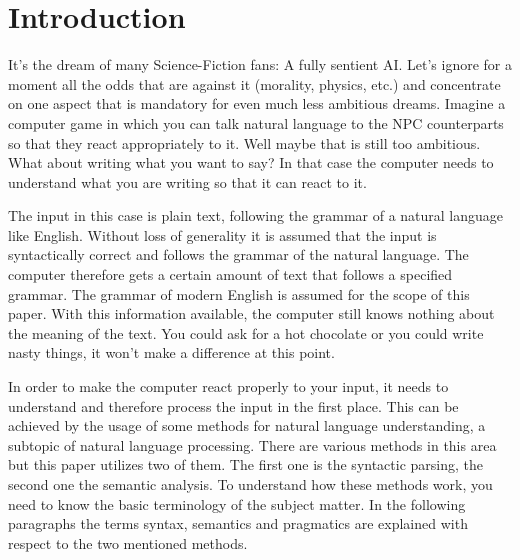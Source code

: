 \documentclass[12pt,twoside]{scrartcl}
\theoremstyle{plain}
\theoremstyle{definition}
\theoremstyle{remark}
\begin{document}


\section{Introduction}
\label{sec:introduction}


	It's the dream of many Science-Fiction fans: A fully sentient AI. Let's ignore for a moment all the odds that are against it (morality, physics, etc.) and concentrate on one aspect that is mandatory for even much less ambitious dreams. Imagine a computer game in which you can talk natural language to the NPC counterparts so that they react appropriately to it. Well maybe that is still too ambitious. What about writing what you want to say? In that case the computer needs to understand what you are writing so that it can react to it.
	
	The input in this case is plain text, following the grammar of a natural language like English. Without loss of generality it is assumed that the input is syntactically correct and follows the grammar of the natural language. The computer therefore gets a certain amount of text that follows a specified grammar. The grammar of modern English is assumed for the scope of this paper. With this information available, the computer still knows nothing about the meaning of the text. You could ask for a hot chocolate or you could write nasty things, it won't make a difference at this point.
	
	In order to make the computer react properly to your input, it needs to understand and therefore process the input in the first place. This can be achieved by the usage of some methods for natural language understanding, a subtopic of natural language processing.\cite{Wikipedi2013} There are various methods in this area but this paper utilizes two of them. The first one is the syntactic parsing, the second one the semantic analysis. To understand how these methods work, you need to know the basic terminology of the subject matter. In the following paragraphs the terms syntax, semantics and pragmatics are explained with respect to the two mentioned methods.
	
\end{document}

